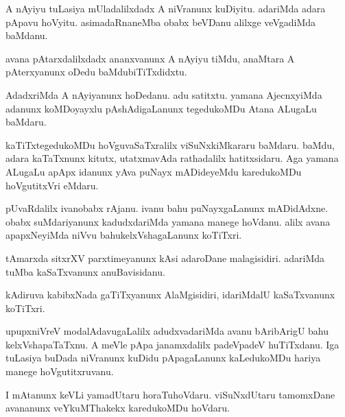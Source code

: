 \begin{mng}
A nAyiyu tuLasiya mUladalilxdadx A niVranunx kuDiyitu. adariMda adara pApavu hoVyitu. asimadaRnaneMba obabx beVDanu alilxge veVgadiMda baMdanu.
\end{mng}

\begin{mng}
avana pAtarxdalilxdadx ananxvanunx A nAyiyu tiMdu, anaMtara A pAterxyanunx oDedu baMdubiTiTxdidxtu.
\end{mng}

\begin{mng}
AdadxriMda A nAyiyanunx hoDedanu. adu satitxtu. yamana AjecnxyiMda adanunx koMDoyayxlu pAshAdigaLanunx tegedukoMDu Atana ALugaLu baMdaru.
\end{mng}

\begin{mng}
kaTiTxtegedukoMDu hoVguvaSaTxralilx viSuNxkiMkararu baMdaru. baMdu, adara kaTaTxnunx kitutx, utatxmavAda rathadalilx hatitxsidaru. Aga yamana ALugaLu apApx idanunx yAva puNayx mADideyeMdu karedukoMDu hoVgutitxVri eMdaru.
\end{mng}

\begin{mng}
pUvaRdalilx ivanobabx rAjanu. ivanu bahu puNayxgaLanunx mADidAdxne. obabx suMdariyanunx kadudxdariMda yamana manege hoVdanu. alilx avana apapxNeyiMda niVvu bahukelxVshagaLanunx koTiTxri.
\end{mng}

\begin{mng}
tAmarxda sitxrXV parxtimeyanunx kAsi adaroDane malagisidiri. adariMda tuMba kaSaTxvanunx anuBavisidanu.
\end{mng}

\begin{mng}
kAdiruva kabibxNada gaTiTxyanunx AlaMgisidiri, idariMdalU kaSaTxvanunx koTiTxri.
\end{mng}

\begin{mng}
upupxniVreV modalAdavugaLalilx adudxvadariMda avanu bAribArigU bahu kelxVshapaTaTxnu. A meVle pApa janamxdalilx padeVpadeV huTiTxdanu. Iga tuLasiya buDada niVranunx kuDidu pApagaLanunx kaLedukoMDu hariya manege hoVgutitxruvanu.
\end{mng}

\begin{mng}
I mAtanunx keVLi yamadUtaru horaTuhoVdaru. viSuNxdUtaru tamomxDane avananunx veYkuMThakekx karedukoMDu hoVdaru.
\end{mng}


